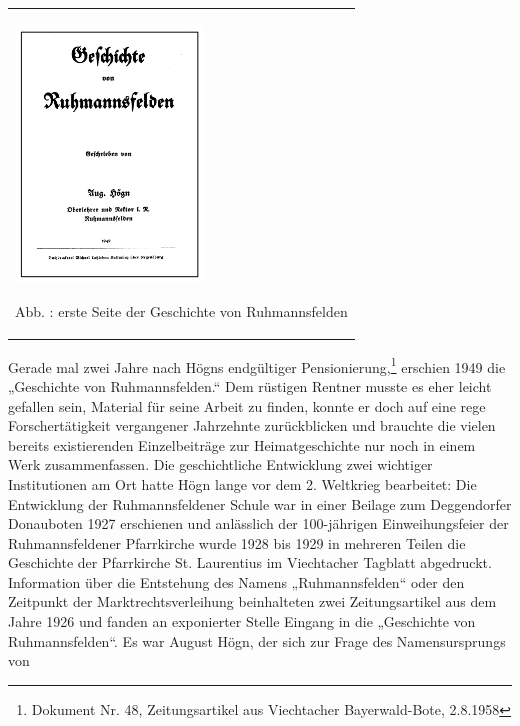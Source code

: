 \begin{flushleft}
\tablefirsthead{}
\tablehead{}
\tabletail{}
\tablelasttail{}
\begin{supertabular}{m{5.2310004cm}}

\begin{center}

\includegraphics[width=4.995cm,height=6.833cm]{pictures/zulassungsarbeit-img040.png}

\end{center}
Abb. : erste Seite der Geschichte von
Ruhmannsfelden\\
\end{supertabular}
\end{flushleft}
Gerade mal zwei Jahre nach Högns endgültiger Pensionierung,\footnote{
Dokument Nr. 48, Zeitungsartikel aus Viechtacher Bayerwald-Bote,
2.8.1958} erschien 1949 die „Geschichte von Ruhmannsfelden.“ Dem
rüstigen Rentner musste es eher leicht gefallen sein, Material für
seine Arbeit zu finden, konnte er doch auf eine rege Forschertätigkeit
vergangener Jahrzehnte zurückblicken und brauchte die vielen bereits
existierenden Einzelbeiträge zur Heimatgeschichte nur noch in einem
Werk zusammenfassen. Die geschichtliche Entwicklung zwei wichtiger
Institutionen am Ort hatte Högn lange vor dem 2. Weltkrieg bearbeitet:
Die Entwicklung der Ruhmannsfeldener Schule war in einer Beilage zum
Deggendorfer Donauboten 1927 erschienen und anlässlich der 100-jährigen
Einweihungsfeier der Ruhmannsfeldener Pfarrkirche wurde 1928 bis 1929
in mehreren Teilen die Geschichte der Pfarrkirche St. Laurentius im
Viechtacher Tagblatt abgedruckt. Information über die Entstehung des
Namens „Ruhmannsfelden“ oder den Zeitpunkt der Marktrechtsverleihung
beinhalteten zwei Zeitungsartikel aus dem Jahre 1926 und fanden an
exponierter Stelle Eingang in die „Geschichte von Ruhmannsfelden“. Es
war August Högn, der sich zur Frage des Namensursprungs von
